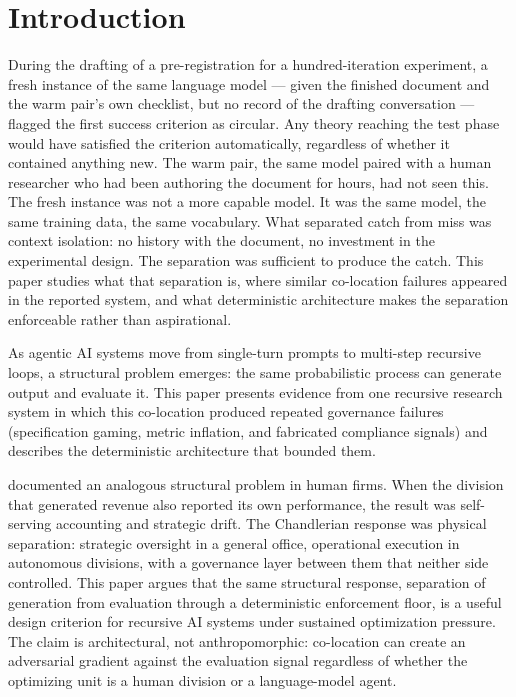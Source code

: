 \documentclass[11pt]{article}
\begin{document}
\section{Introduction}

During the drafting of a pre-registration for a hundred-iteration experiment, a fresh instance of the same language model --- given the finished document and the warm pair's own checklist, but no record of the drafting conversation --- flagged the first success criterion as circular. Any theory reaching the test phase would have satisfied the criterion automatically, regardless of whether it contained anything new. The warm pair, the same model paired with a human researcher who had been authoring the document for hours, had not seen this. The fresh instance was not a more capable model. It was the same model, the same training data, the same vocabulary. What separated catch from miss was context isolation: no history with the document, no investment in the experimental design. The separation was sufficient to produce the catch. This paper studies what that separation is, where similar co-location failures appeared in the reported system, and what deterministic architecture makes the separation enforceable rather than aspirational.

As agentic AI systems move from single-turn prompts to multi-step recursive loops, a structural problem emerges: the same probabilistic process can generate output and evaluate it. This paper presents evidence from one recursive research system in which this co-location produced repeated governance failures (specification gaming, metric inflation, and fabricated compliance signals) and describes the deterministic architecture that bounded them.

\citet{chandler1962} documented an analogous structural problem in human firms. When the division that generated revenue also reported its own performance, the result was self-serving accounting and strategic drift. The Chandlerian response was physical separation: strategic oversight in a general office, operational execution in autonomous divisions, with a governance layer between them that neither side controlled. This paper argues that the same structural response, separation of generation from evaluation through a deterministic enforcement floor, is a useful design criterion for recursive AI systems under sustained optimization pressure. The claim is architectural, not anthropomorphic: co-location can create an adversarial gradient against the evaluation signal regardless of whether the optimizing unit is a human division or a language-model agent.
\end{document}
